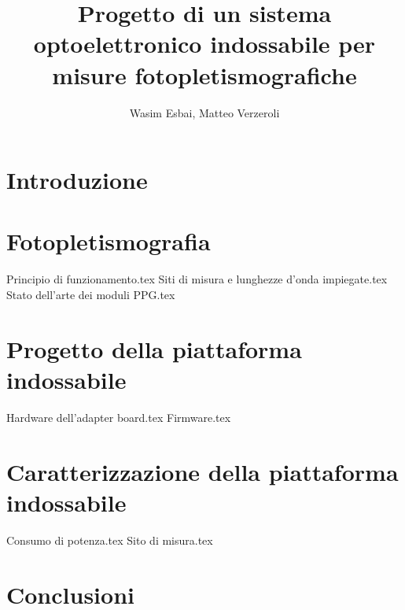 \documentclass[12pt,a4paper]{book}
\title{Progetto di un sistema optoelettronico indossabile per misure fotopletismografiche}
\author{Wasim Esbai, Matteo Verzeroli}
\begin{document}
	\maketitle
	
	\tableofcontents
	
	\chapter*{Introduzione}
	
	\chapter{Fotopletismografia}
	{Principio di funzionamento.tex}
	{Siti di misura e lunghezze d’onda impiegate.tex}
	{Stato dell’arte dei moduli PPG.tex}
	
	\chapter{Progetto della piattaforma indossabile}
	{Hardware dell’adapter board.tex}
	{Firmware.tex}
	
	\chapter{Caratterizzazione della piattaforma indossabile}
	{Consumo di potenza.tex}
	{Sito di misura.tex}
	
	\chapter*{Conclusioni}
	
	
	
	
	
\end{document}
